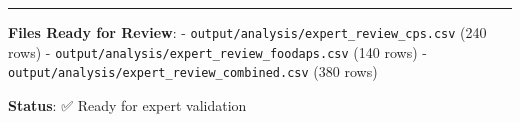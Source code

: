 \documentclass[
  letterpaper,
]{report}
\begin{document}
\begin{center}\rule{0.5\linewidth}{0.5pt}\end{center}

\textbf{Files Ready for Review}: -
\texttt{output/analysis/expert\_review\_cps.csv} (240 rows) -
\texttt{output/analysis/expert\_review\_foodaps.csv} (140 rows) -
\texttt{output/analysis/expert\_review\_combined.csv} (380 rows)

\textbf{Status}: ✅ Ready for expert validation
\end{document}
